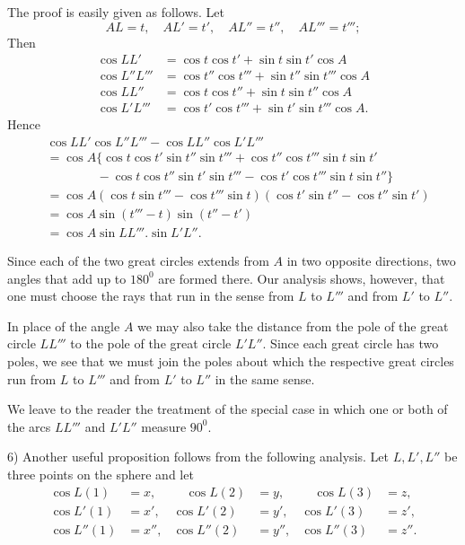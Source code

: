 \par{}%
\noindent\hspace*{1.2em}The proof is easily given as follows. Let
\[
AL=t,\quad AL'=t',\quad AL''=t'',\quad AL'''=t''';
\]
Then
\[
\begin{aligned}
\cos LL'&=\cos t\cos t'+\sin t\sin t'\cos A\\
\cos L''L'''&=\cos t''\cos t'''+\sin t''\sin t'''\cos A\\
\cos LL''&=\cos t\cos t''+\sin t\sin t''\cos A\\
\cos L'L'''&=\cos t'\cos t'''+\sin t'\sin t'''\cos A.
\end{aligned}
\]
Hence
\[
\begin{aligned}
&\cos LL'\cos L''L'''-\cos LL''\cos L'L'''\\
&=\cos A\{\cos t\cos t'\sin t''\sin t'''+\cos t''\cos t'''\sin t\sin t'\\
&\qquad\qquad-\cos t\cos t''\sin t'\sin t'''-\cos t'\cos t'''\sin t\sin t''\}\\
&=\cos A(\cos t\sin t'''-\cos t'''\sin t)(\cos t'\sin t''-\cos t''\sin t')\\
&=\cos A\sin(t'''-t)\sin(t''-t')\\
&=\cos A\sin LL'''.\sin L'L''.
\end{aligned}
\]

Since each of the two great circles extends from $A$ in two opposite directions, two angles that add up to $180^{0}$ are formed there. Our analysis shows, however, that one must choose the rays that run in the sense from $L$ to $L'''$ and from $L'$ to $L''$.

In place of the angle $A$ we may also take the distance from the pole of the great circle $LL'''$ to the pole of the great circle $L'L''$. Since each great circle has two poles, we see that we must join the poles about which the respective great circles run from $L$ to $L'''$ and from $L'$ to $L''$ in the same sense.

We leave to the reader the treatment of the special case in which one or both of the arcs $LL'''$ and $L'L''$ measure $90^{0}$.

6) Another useful proposition follows from the following analysis. Let $L,L',L''$ be three points on the sphere and let
\[
\begin{aligned}
\cos L(1)&=x,&\quad\cos L(2)&=y,&\quad\cos L(3)&=z,\\
\cos L'(1)&=x',&\cos L'(2)&=y',&\cos L'(3)&=z',\\
\cos L''(1)&=x'',&\cos L''(2)&=y'',&\cos L''(3)&=z''.
\end{aligned}
\]
